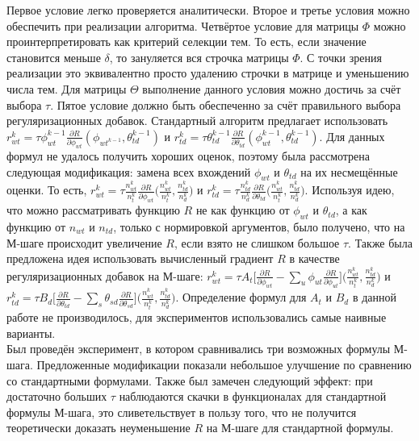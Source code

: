 \documentclass[12pt]{article}
\begin{document}
Первое условие легко проверяется аналитически. Второе и третье условия можно обеспечить при реализации алгоритма. Четвёртое условие для матрицы $\Phi$ можно проинтерпретировать как критерий селекции тем. То есть, если значение становится меньше $\delta$, то зануляется вся строчка матрицы $\Phi$. С точки зрения реализации это эквивалентно просто удалению строчки в матрице и уменьшению числа тем. Для матрицы $\Theta$ выполнение данного условия можно достичь за счёт выбора $\tau$. Пятое условие должно быть обеспеченно за счёт правильного выбора регуляризационных добавок. Стандартный алгоритм предлагает использовать $r_{wt}^{k} = \tau \phi_{wt}^{k-1} \frac{\partial{R}}{\partial{\phi_{wt}}}(\phi_{wt^{k-1}}, \theta_{td}^{k-1})$ и $r_{td}^{k}=\tau  \theta_{td}^{k-1} \frac{\partial{R}}{\partial{\theta_{td}}}(\phi_{wt}^{k-1}, \theta_{td}^{k-1})$. Для данных формул не удалось получить хороших оценок, поэтому была рассмотрена следующая модификация: замена всех вхождений $\phi_{wt}$ и $\theta_{td}$ на их несмещённые оценки. То есть,  $r_{wt}^k= \tau \frac{n^k_{wt}}{n^k_t}\frac{\partial{R}}{\partial{\phi_{wt}}}\bigl(\frac{n^k_{wt}}{n^k_t}, \frac{n^k_{td}}{n^k_d}\bigr)$ и $r_{td}^k= \tau \frac{n^k_{td}}{n^k_d}\frac{\partial{R}}{\partial{\theta_{td}}}\bigl(\frac{n^k_{wt}}{n^k_t}, \frac{n^k_{td}}{n^k_d}\bigr)$. Используя идею, что можно рассматривать функцию $R$ не как функцию от $\phi_{wt}$ и $\theta_{td}$, а как функцию от $n_{wt}$ и $n_{td}$, только с нормировкой аргументов, было получено, что на М-шаге происходит увеличение $R$, если взято не слишком большое $\tau$. Также была предложена идея использовать вычисленный градиент $R$ в качестве регуляризационных добавок на М-шаге: $r^k_{wt} = \tau A_t \bigl[{\frac{\partial{R}}{\partial{\phi_{wt}}} - \sum\limits_u \phi_{ut} \frac{\partial{R}}{\partial{\phi_{ut}}} }\bigr] \bigl(\frac{n^k_{wt}}{n^k_t}, \frac{n^k_{td}}{n^k_d}\bigr)$ и $r^k_{td} = \tau B_d \bigl[ {\frac{\partial{R}}{\partial{\theta_{td}}} - \sum\limits_s \theta_{sd} \frac{\partial{R}}{\partial{\theta_{sd}}} }\bigr] \bigl(\frac{n^k_{wt}}{n^k_t}, \frac{n^k_{td}}{n^k_d}\bigr)$. Определение формул для $A_t$ и $B_d$ в данной работе не производилось, для экспериментов использовались самые наивные варианты.\\
Был проведён эксперимент, в котором сравнивались три возможных формулы М-шага. Предложенные модификации показали небольшое улучшение по сравнению со стандартными формулами. Также был замечен следующий эффект: при достаточно больших $\tau$ наблюдаются скачки в функционалах для стандартной формулы М-шага, это сливетельствует в пользу того, что не получится теоретически доказать неуменьшение $R$ на М-шаге для стандартной формулы.\\
\end{document}
